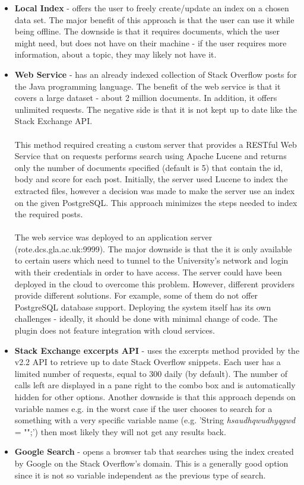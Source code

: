 \documentclass{l4proj}
\begin{document}
\begin{itemize}

\item \textbf{Local Index} - offers the user to freely create/update an index on a chosen data set. The major benefit of this approach is that the user can use it while being offline. The downside is that it requires documents, which the user might need, but does not have on their machine - if the user requires more information, about a topic, they may likely not have it.  

\item \textbf{Web Service} - has an already indexed collection of Stack Overflow posts for the Java programming language.  The benefit of the web service is that it covers a large dataset - about 2 million documents. In addition, it offers unlimited requests. The negative side is that it is not kept up to date like the Stack Exchange API. 
\\
\\
This method required creating a custom server that provides a RESTful Web Service that on requests performs search using Apache Lucene and returns only the number of documents specified (default is 5) that contain the id, body and score for each post. 
Initially, the server used Lucene to index the extracted files, however a decision was made to make the server use an index on the given PostgreSQL. This approach minimizes the steps needed to index the required posts.
\\
\\
The web service was deployed to an application server (rote.dcs.gla.ac.uk:9999). The major downside is that the it is only available to certain users which need to tunnel to the University's network and login with their credentials in order to have access. The server could have been deployed in the cloud to overcome this problem. However, different providers provide different solutions. For example, some of them do not offer PostgreSQL database support. Deploying the system itself has its own challenges - ideally, it should be done with minimal change of code. The plugin does not feature integration with cloud services. 

\item \textbf{Stack Exchange excerpts API} \cite{stackexchange-excerpts} - uses the excerpts method provided by the v2.2 API to retrieve up to date Stack Overflow snippets. Each user has a limited number of requests, equal to 300 daily (by default). The number of calls left are displayed in a pane right to the combo box and is automatically hidden for other options. Another downside is that this approach depends on variable names e.g. in the worst case if the user chooses to search for a something with a very specific variable name (e.g. 'String \textit{hsaudhqwudhyqgwd} = "";') then most likely they will not get any results back.

\item \textbf{Google Search} - opens a browser tab that searches using the index created by Google on the Stack Overflow's domain. This is a generally good option since it is not so variable independent as the previous type of search.

\end{itemize} 
\end{document}
